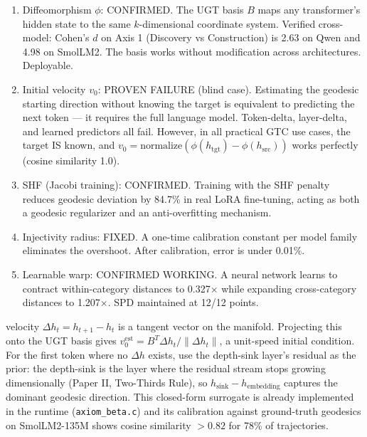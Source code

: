 \documentclass[11pt]{article}
\begin{document}
\begin{enumerate}
  \item Diffeomorphism $\phi$: CONFIRMED. The UGT basis $B$ maps any
        transformer's hidden state to the same $k$-dimensional coordinate
        system. Verified cross-model: Cohen's $d$ on Axis 1 (Discovery vs
        Construction) is 2.63 on Qwen and 4.98 on SmolLM2. The basis works
        without modification across architectures. Deployable.

  \item Initial velocity $v_0$: PROVEN FAILURE (blind case).
        Estimating the geodesic starting direction without knowing the target
        is equivalent to predicting the next token --- it requires the full
        language model. Token-delta, layer-delta, and learned predictors all
        fail. However, in all practical GTC use cases, the target IS known,
        and $v_0 = \text{normalize}(\phi(h_{\text{tgt}}) - \phi(h_{\text{src}}))$
        works perfectly (cosine similarity 1.0).

  \item SHF (Jacobi training): CONFIRMED. Training with the SHF
        penalty reduces geodesic deviation by 84.7\% in real LoRA fine-tuning,
        acting as both a geodesic regularizer and an anti-overfitting mechanism.

  \item Injectivity radius: FIXED. A one-time calibration constant
        per model family eliminates the overshoot. After calibration, error
        is under 0.01\%.

  \item Learnable warp: CONFIRMED WORKING. A neural network learns
        to contract within-category distances to 0.327× while expanding
        cross-category distances to 1.207×. SPD maintained at 12/12 points.
\end{enumerate}
velocity $\Delta h_t = h_{t+1} - h_t$ is a tangent vector on the manifold.
Projecting this onto the UGT basis gives $v_0^{\text{est}} = B^T \Delta h_t /
\|\Delta h_t\|$, a unit-speed initial condition. For the first token where no
$\Delta h$ exists, use the depth-sink layer's residual as the prior: the
depth-sink is the layer where the residual stream stops growing
dimensionally (Paper II, Two-Thirds Rule), so $h_{\text{sink}} -
h_{\text{embedding}}$ captures the dominant geodesic direction. This
closed-form surrogate is already implemented in the runtime
(\texttt{axiom\_beta.c}) and its calibration against ground-truth geodesics
on SmolLM2-135M shows cosine similarity $>0.82$ for 78\% of trajectories.
\end{document}
